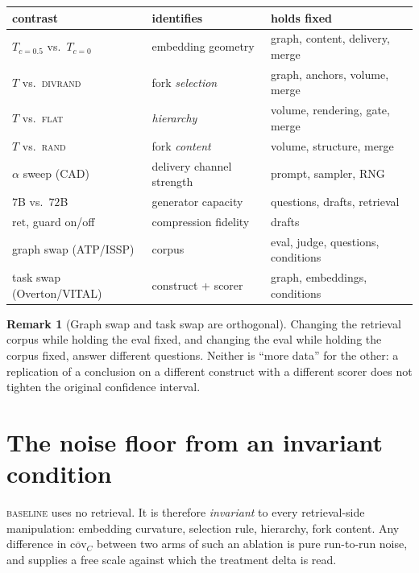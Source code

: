 \documentclass[11pt]{article}
\theoremstyle{definition}
\newtheorem{remark}{Remark}
\newcommand{\cov}{\mathrm{cov}}
\newcommand{\ret}{\mathrm{ret}}
\newcommand{\1}{\mathbf{1}}
\begin{document}
\begin{center}
\begin{tabular}{@{}lll@{}}
\toprule
contrast & identifies & holds fixed \\
\midrule
$T_{c=0.5}$ vs.\ $T_{c=0}$ & embedding geometry & graph, content, delivery, merge \\
$T$ vs.\ \textsc{divrand} & fork \emph{selection} & graph, anchors, volume, merge \\
$T$ vs.\ \textsc{flat} & \emph{hierarchy} & volume, rendering, gate, merge \\
$T$ vs.\ \textsc{rand} & fork \emph{content} & volume, structure, merge \\
$\alpha$ sweep (CAD) & delivery channel strength & prompt, sampler, RNG \\
$7$B vs.\ $72$B & generator capacity & questions, drafts, retrieval \\
$\ret$, guard on/off & compression fidelity & drafts \\
graph swap (ATP/ISSP) & corpus & eval, judge, questions, conditions \\
task swap (Overton/VITAL) & construct + scorer & graph, embeddings, conditions \\
\bottomrule
\end{tabular}
\end{center}

\begin{remark}[Graph swap and task swap are orthogonal]
Changing the retrieval corpus while holding the eval fixed, and changing the eval
while holding the corpus fixed, answer different questions. Neither is ``more
data'' for the other: a replication of a conclusion on a different construct with
a different scorer does not tighten the original confidence interval.
\end{remark}

\section{The noise floor from an invariant condition}

\textsc{baseline} uses no retrieval. It is therefore \emph{invariant} to every
retrieval-side manipulation: embedding curvature, selection rule, hierarchy, fork
content. Any difference in $\overline{\cov}_C$ between two arms of such an
ablation is pure run-to-run noise, and supplies a free scale against which the
treatment delta is read.
\end{document}
